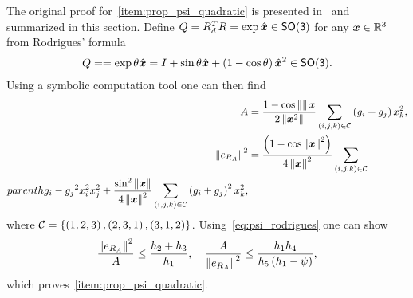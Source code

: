 The original proof for~\cref{item:prop_psi_quadratic} is presented in~\cite{lee2011a} and summarized in this section.
Define \( Q = R_d^T R = \exp \hat{\bm{x}} \in \mathsf{SO(3)} \) for any \( \bm{x} \in \mathbb{R}^3 \) from Rodrigues' formula
\begin{align}\label{eq:rodrigues_formula}
    Q = = \exp{\theta \hat{\bm{x}}} = I + \sin \theta \hat{\bm{x}} + \left( 1 - \cos \theta \right) \hat{\bm{x}}^2 \in \mathsf{SO(3)}.
\end{align}
Using a symbolic computation tool one can then find
\begin{align}\label{eq:psi_rodrigues}
    A &= \frac{1 - \cos \left\| \bm{\right}\|{x}}{2\left\| \bm{x}^2 \right\|} \sum_{\left( i, j, k \right) \in \mathcal{C}} \left( g_i + g_j \right) x_k^2, \\
    \left\| e_{R_A} \right\|^2 &= \frac{\left( 1 - \cos \left\| \bm{x} \right\|^2 \right) }{4 \left\| \bm{x} \right\|^2}  \sum_{\left( i, j, k \right) \in \mathcal{C}} \\parenth{g_i - g_j}^2 x_i^2 x_j^2 + \frac{\sin^2 \left\| \bm{x} \right\|}{4 \left\| \bm{x} \right\|^2} \sum_{\left( i, j, k \right) \in \mathcal{C}} \left( g_i + g_j \right)^2 x_k^2,
\end{align}
where \( \mathcal{C} = \left\{  \left( 1, 2, 3 \right) , \left( 2, 3, 1 \right) , \left( 3, 1, 2 \right)  \right\} \).
Using~\cref{eq:psi_rodrigues} one can show
\begin{align}
    \frac{\left\| e_{R_A} \right\|^2}{A} \leq \frac{h_2 + h_3}{h_1} , \quad \frac{A}{\left\| e_{R_A} \right\|^2} \leq \frac{h_1 h_4}{h_5 \left( h_1 - \psi \right) } ,
\end{align}
which proves~\cref{item:prop_psi_quadratic}.



